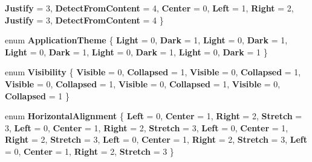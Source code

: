 \begin{DoxyCompactItemize}
{\bfseries Justify} = 3, 
{\bfseries Detect\+From\+Content} = 4, 
\newline
{\bfseries Center} = 0, 
{\bfseries Left} = 1, 
{\bfseries Right} = 2, 
{\bfseries Justify} = 3, 
\newline
{\bfseries Detect\+From\+Content} = 4
 \}
\item 
\mbox{\label{namespace_windows_1_1_u_i_1_1_xaml_ace78659e508744cb10b2d252833ef022}} 
enum {\bfseries Application\+Theme} \{ \newline
{\bfseries Light} = 0, 
{\bfseries Dark} = 1, 
{\bfseries Light} = 0, 
{\bfseries Dark} = 1, 
\newline
{\bfseries Light} = 0, 
{\bfseries Dark} = 1, 
{\bfseries Light} = 0, 
{\bfseries Dark} = 1, 
\newline
{\bfseries Light} = 0, 
{\bfseries Dark} = 1
 \}
\item 
\mbox{\label{namespace_windows_1_1_u_i_1_1_xaml_ab3fbc626243929a7adbc7f2170933135}} 
enum {\bfseries Visibility} \{ \newline
{\bfseries Visible} = 0, 
{\bfseries Collapsed} = 1, 
{\bfseries Visible} = 0, 
{\bfseries Collapsed} = 1, 
\newline
{\bfseries Visible} = 0, 
{\bfseries Collapsed} = 1, 
{\bfseries Visible} = 0, 
{\bfseries Collapsed} = 1, 
\newline
{\bfseries Visible} = 0, 
{\bfseries Collapsed} = 1
 \}
\item 
\mbox{\label{namespace_windows_1_1_u_i_1_1_xaml_a296d6e339e45f69b5f76a1183a51fef6}} 
enum {\bfseries Horizontal\+Alignment} \{ \newline
{\bfseries Left} = 0, 
{\bfseries Center} = 1, 
{\bfseries Right} = 2, 
{\bfseries Stretch} = 3, 
\newline
{\bfseries Left} = 0, 
{\bfseries Center} = 1, 
{\bfseries Right} = 2, 
{\bfseries Stretch} = 3, 
\newline
{\bfseries Left} = 0, 
{\bfseries Center} = 1, 
{\bfseries Right} = 2, 
{\bfseries Stretch} = 3, 
\newline
{\bfseries Left} = 0, 
{\bfseries Center} = 1, 
{\bfseries Right} = 2, 
{\bfseries Stretch} = 3, 
\newline
{\bfseries Left} = 0, 
{\bfseries Center} = 1, 
{\bfseries Right} = 2, 
{\bfseries Stretch} = 3
 \}
\item 

\end{DoxyCompactItemize}
